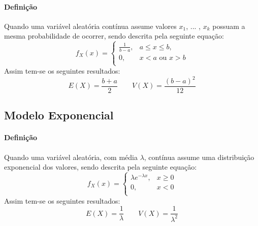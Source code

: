\documentclass{article}
\begin{document}
            \paragraph{Definição}Quando uma variável aleatória contínua assume valores $x_{1}$, ... , $x_{k}$ possuam a mesma probabilidade de ocorrer, sendo descrita pela seguinte equação:
                \begin{equation}
                    \boxed{
                        f_{X}(x) = 
                        \begin{cases}
                            \frac{1}{b-a}, & a \le x \le b,\\
                            0,             & x < a \text{ ou } x > b\\
                        \end{cases}
                    }
                \end{equation}
            Assim tem-se os seguintes resultados:
                \begin{equation}
                    \boxed{
                        E(X) = \frac{b+a}{2}
                    }
                    \qquad
                    \boxed{
                        V(X) = \frac{(b-a)^{2}}{12}
                    }
                \end{equation}

        \subsection{Modelo Exponencial}
            \paragraph{Definição}Quando uma variável aleatória, com média $\lambda$, contínua assume uma distribuição exponencial dos valores, sendo descrita pela seguinte equação:
                \begin{equation}
                    \boxed{
                        f_{X}(x) = 
                        \begin{cases}
                            \lambda e^{-\lambda x}, & x \ge 0\\
                            0,                      & x < 0\\
                        \end{cases}
                    }
                \end{equation}
            Assim tem-se os seguintes resultados:
                \begin{equation}
                    \boxed{
                        E(X) = \frac{1}{\lambda}
                    }
                    \qquad
                    \boxed{
                        V(X) = \frac{1}{\lambda^2}
                    }
                \end{equation}
\end{document}
